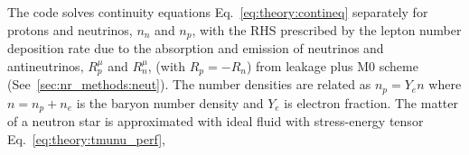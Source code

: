 The code solves continuity equations Eq.~\eqref{eq:theory:contineq} separately for 
protons and neutrinos, $n_n$ and $n_p$, with the \ac{RHS} prescribed by the 
lepton number deposition rate due to the absorption and emission of neutrinos 
and antineutrinos, $R_p^\mu$ and $R_n^\mu$, (with $R_p = -R_n$) 
from leakage plus M0 scheme (See~\ref{sec:nr_methods:neut}).
%
%
%
%
%
%
The number densities are related as $n_p=Y_e n$ where $n = n_p + n_e$ is the baryon 
number density and $Y_e$ is electron fraction.
%
The matter of a neutron star is approximated with ideal fluid 
with stress-energy tensor Eq.~\eqref{eq:theory:tmunu_perf},
%



